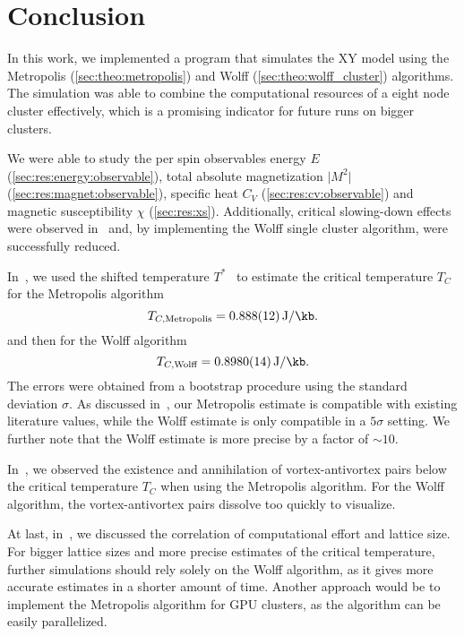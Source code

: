 \chapter{Conclusion}
	In this work, we implemented a program that simulates the XY model using the Metropolis (\cref{sec:theo:metropolis}) and Wolff (\cref{sec:theo:wolff_cluster}) algorithms. The simulation was able to combine the computational resources of a eight node cluster effectively, which is a promising indicator for future runs on bigger clusters.
	
	We were able to study the per spin observables energy $E$ (\cref{sec:res:energy:observable}), total absolute magnetization $\lvert M^2 \rvert$ (\cref{sec:res:magnet:observable}), specific heat $C_V$ (\cref{sec:res:cv:observable}) and magnetic susceptibility $\chi$ (\cref{sec:res:xs}). Additionally, critical slowing-down effects were observed in~ and, by implementing the Wolff single cluster algorithm, were successfully reduced.
	
	In~, we used the shifted temperature $T^*$~\citep{shifted} to estimate the critical temperature $T_C$ for the Metropolis algorithm
	\begin{equation}
			T_{C, \text{Metropolis}} = \SI{0.888(12)}{\J\per\kb}.
	\end{equation}
	and then for the Wolff algorithm
	\begin{equation}
			T_{C, \text{Wolff}} = \SI{0.8980(14)}{\J\per\kb}.
	\end{equation}
	The errors were obtained from a bootstrap procedure using the standard deviation $\sigma$. As discussed in~, our Metropolis estimate is compatible with existing literature values, while the Wolff estimate is only compatible in a $5\sigma$ setting. We further note that the Wolff estimate is more precise by a factor of $\sim 10$.
	
	In~, we observed the existence and annihilation of vortex-antivortex pairs below the critical temperature $T_C$ when using the Metropolis algorithm. For the Wolff algorithm, the vortex-antivortex pairs dissolve too quickly to visualize.
	
	At last, in~, we discussed the correlation of computational effort and lattice size. For bigger lattice sizes and more precise estimates of the critical temperature, further simulations should rely solely on the Wolff algorithm, as it gives more accurate estimates in a shorter amount of time. Another approach would be to implement the Metropolis algorithm for GPU clusters, as the algorithm can be easily parallelized.
